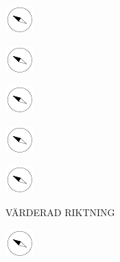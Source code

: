\documentclass[11pt,titlepage]{article}
\begin{document}
\vspace{12mm}

\noindent
\hspace{1mm}\includegraphics[]{compass.pdf}

\vspace{12mm}

\noindent
\hspace{1mm}\includegraphics[]{compass.pdf}

\vspace{12mm}

\noindent
\hspace{1mm}\includegraphics[]{compass.pdf}

\vspace{12mm}

\noindent
\hspace{1mm}\includegraphics[]{compass.pdf}

\vspace{12mm}

\noindent
\hspace{1mm}\includegraphics[]{compass.pdf}

\pagebreak

\small
\hfill VÄRDERAD RIKTNING

\vspace{6mm}

\noindent
\hspace{1mm}\includegraphics[]{compass.pdf}

\vspace{12mm}
\end{document}

